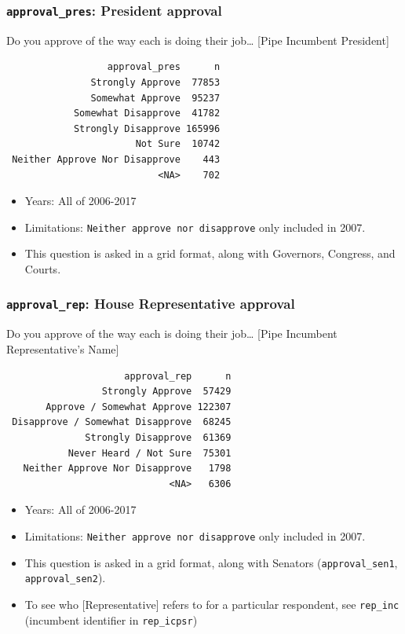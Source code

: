 \documentclass[10pt,article,oneside]{memoir}
\theoremstyle{definition}
\begin{document}
\subsubsection{\texorpdfstring{\texttt{approval\_pres}: President
approval}{approval\_pres: President approval}}\label{approval_pres-president-approval}

Do you approve of the way each is doing their job\ldots{} {[}Pipe
Incumbent President{]}

\begin{verbatim}
                  approval_pres      n
               Strongly Approve  77853
               Somewhat Approve  95237
            Somewhat Disapprove  41782
            Strongly Disapprove 165996
                       Not Sure  10742
 Neither Approve Nor Disapprove    443
                           <NA>    702
\end{verbatim}

\begin{itemize}
\tightlist
\item
  Years: All of 2006-2017
\item
  Limitations: \texttt{Neither\ approve\ nor\ disapprove} only included
  in 2007.
\item
  This question is asked in a grid format, along with Governors,
  Congress, and Courts.
\end{itemize}

\subsubsection{\texorpdfstring{\texttt{approval\_rep}: House
Representative
approval}{approval\_rep: House Representative approval}}\label{approval_rep-house-representative-approval}

Do you approve of the way each is doing their job\ldots{} {[}Pipe
Incumbent Representative's Name{]}

\begin{verbatim}
                     approval_rep      n
                 Strongly Approve  57429
       Approve / Somewhat Approve 122307
 Disapprove / Somewhat Disapprove  68245
              Strongly Disapprove  61369
           Never Heard / Not Sure  75301
   Neither Approve Nor Disapprove   1798
                             <NA>   6306
\end{verbatim}

\begin{itemize}
\tightlist
\item
  Years: All of 2006-2017
\item
  Limitations: \texttt{Neither\ approve\ nor\ disapprove} only included
  in 2007.
\item
  This question is asked in a grid format, along with Senators
  (\texttt{approval\_sen1}, \texttt{approval\_sen2}).
\item
  To see who {[}Representative{]} refers to for a particular respondent,
  see \texttt{rep\_inc} (incumbent identifier in \texttt{rep\_icpsr})
\end{itemize}
\end{document}
